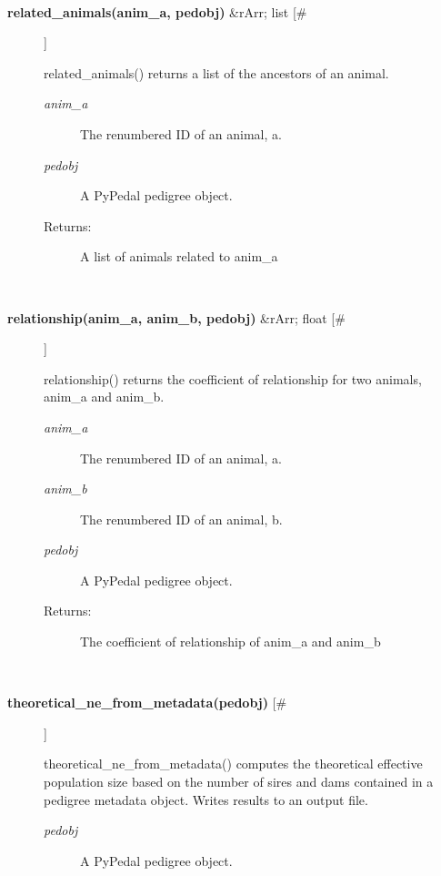 \begin{description}
\begin{description}
\end{description}
\\ 

\item[\textbf{related\_animals(anim\_a, pedobj)}
 \&rArr; list [\#]]

 related\_animals() returns a list of the ancestors of an animal.
\begin{description}
\item[\emph{anim\_a}
] The renumbered ID of an animal, a.
\item[\emph{pedobj}
] A PyPedal pedigree object.
\item[Returns:] A list of animals related to anim\_a

\end{description}
\\ 

\item[\textbf{relationship(anim\_a, anim\_b, pedobj)}
 \&rArr; float [\#]]

 relationship() returns the coefficient of relationship for two animals, anim\_a and anim\_b.
\begin{description}
\item[\emph{anim\_a}
] The renumbered ID of an animal, a.
\item[\emph{anim\_b}
] The renumbered ID of an animal, b.
\item[\emph{pedobj}
] A PyPedal pedigree object.
\item[Returns:] The coefficient of relationship of anim\_a and anim\_b

\end{description}
\\ 

\item[\textbf{theoretical\_ne\_from\_metadata(pedobj)}
 [\#]]

 theoretical\_ne\_from\_metadata() computes the theoretical effective population size based on the number of sires and dams contained in a pedigree metadata object. Writes results to an output file.
\begin{description}
\item[\emph{pedobj}
] A PyPedal pedigree object.

\end{description}
\\ 


\end{description}

